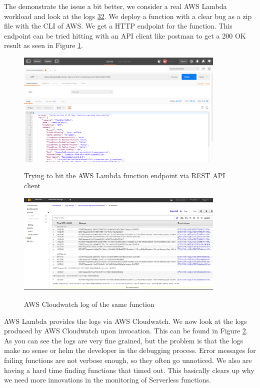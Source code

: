 \documentclass[12pt,titlepage]{article}
\begin{document}
The demonstrate the issue a bit better, we consider a real AWS Lambda workload
and look at the logs \hyperref[ref:32]{32}. We deploy a function with a clear bug as a zip file with the
CLI of AWS. We get a HTTP endpoint for the function. This endpoint can be tried
hitting with an API client like postman to get a 200 OK result as seen in
Figure \ref{fig:postman}. 
\begin{figure}[!h]
    \caption{Trying to hit the AWS Lambda function endpoint via REST API client}
    \centering
    \includegraphics[width=100mm]{./thesis_images/postman.png}
    \label{fig:postman}
\end{figure}
\begin{figure}[!h]
    \caption{AWS Cloudwatch log of the same function}
    \centering
    \includegraphics[width=100mm]{./thesis_images/cloudwatch.png}
    \label{fig:cloudwatch}
\end{figure}

AWS Lambda provides the logs via AWS Cloudwatch. We now look at the logs
produced by AWS Cloudwatch upon invocation. This can be found in Figure \ref{fig:cloudwatch}. As
you can see the logs are very fine grained, but the problem is that the logs
make no sense or helm the developer in the debugging process. Error messages for
failing functions are not verbose enough, so they often go unnoticed. We also are
having a hard time finding functions that timed out. This basically clears up
why we need more innovations in the monitoring of Serverless functions.
\end{document}

